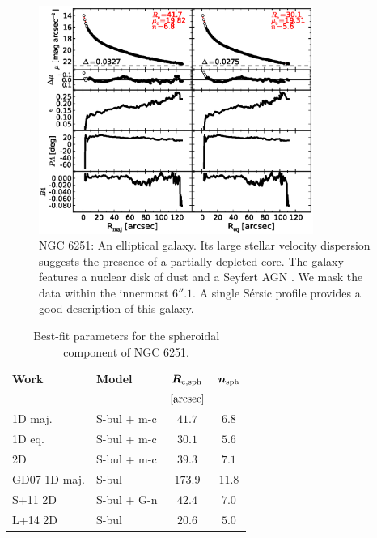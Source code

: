 \documentclass[preprint2]{emulateapj}
\newcommand{\fitfigurewidth}{0.8\textwidth}
\begin{document}
  \begin{figure}[h]
  \begin{center}
  \includegraphics[width=\fitfigurewidth]{n6251_1Dfit.eps}
  \caption{NGC 6251: 
  An elliptical galaxy. 
  Its large stellar velocity dispersion suggests the presence of a partially depleted core.
  The galaxy features a nuclear disk of dust \citep{ferrareseford1999n6251} and a Seyfert AGN \citep{panessabassani2002}.
  We mask the data within the innermost $6''.1$. 
  A single S\'ersic profile provides a good description of this galaxy.
  }
  \end{center}
  \end{figure}

  \begin{table}[h]
  \small
  \caption{Best-fit parameters for the spheroidal component of NGC 6251.}
  \begin{center}
  \begin{tabular}{llcc}
  \hline
  {\bf Work} & {\bf Model}   & $\bm R_{\rm e,sph}$    & $\bm n_{\rm sph}$ \\
    &  &  $[\rm arcsec]$ & \\
  \hline
  1D maj. & S-bul + m-c & $41.7$  &  $6.8$ \\
  1D eq.  & S-bul + m-c & $30.1$  &  $5.6$ \\
  2D      & S-bul + m-c & $39.3$  &  $7.1$ \\
  \hline
  GD07 1D maj.      & S-bul	     & $173.9$  &  $11.8$ \\
  S+11 2D      & S-bul + G-n    & $42.4$	&  $7.0$ \\
  L+14 2D      & S-bul	     & $20.6$	&  $5.0$ \\
  \hline
  \end{tabular}
  \end{center}
  \label{tab:n6251}
  \end{table}
\end{document}
